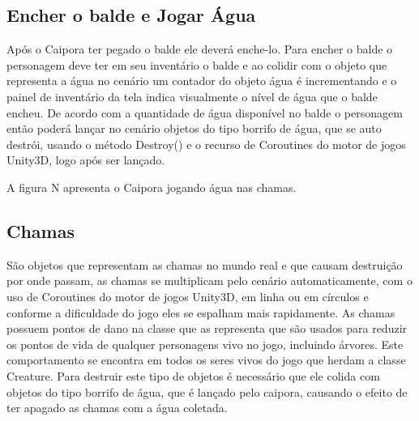 	
\subsection{Encher o balde e Jogar Água}
Após o Caipora ter pegado o balde ele deverá enche-lo. Para encher o balde o personagem deve ter em seu inventário o balde e ao colidir com o objeto que representa a água no cenário um contador do objeto água é incrementando e o painel de inventário da tela indica visualmente o nível de água que o balde encheu. De acordo com a quantidade de água disponível no balde o personagem então poderá lançar no cenário objetos do tipo borrifo de água, que se auto destrói, usando o método Destroy() e o recurso de Coroutines do motor de jogos Unity3D, logo após ser lançado.


A figura N apresenta o Caipora jogando água nas chamas.

\begin{figure}[h!]
		\centering
	\end{figure}
	
	
	
\subsection{Chamas}
São objetos que representam as chamas no mundo real e que causam destruição por onde passam, as chamas se multiplicam pelo cenário automaticamente, com o uso de Coroutines do motor de jogos Unity3D,  em linha ou em círculos e conforme a dificuldade do jogo eles se espalham mais rapidamente. As chamas possuem pontos de dano na classe que as representa que são usados para reduzir os pontos de vida de qualquer personagens vivo no jogo, incluindo árvores. Este comportamento se encontra em todos os seres vivos do jogo que herdam a classe Creature.  
Para destruir este tipo de objetos é necessário que ele colida com objetos do tipo borrifo de água, que é lançado pelo caipora, causando o efeito de ter apagado as chamas com a água coletada.


